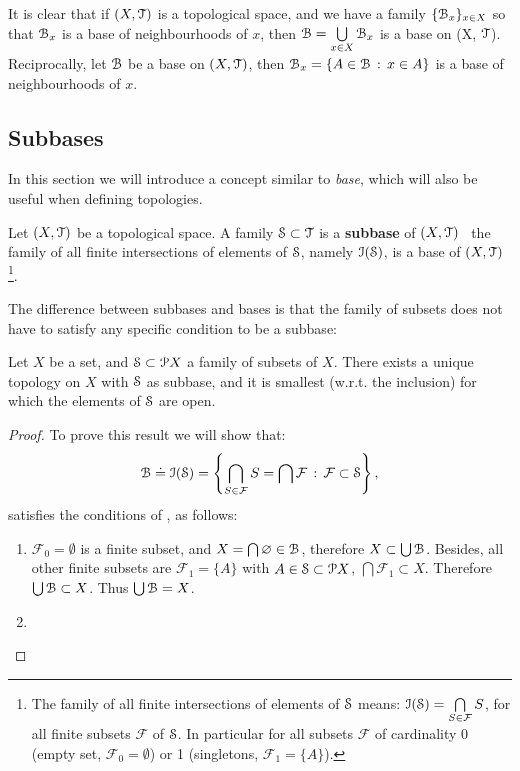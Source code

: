It is clear that if $(X,\T)$ is a topological space, and we have a family 
$\{\B_x\}_{x\in X}$ so that $\B_x$ is a base of neighbourhoods of $x$, then 
$\B=\bigcup\limits_{x\in X}\B_x$ is a base on (X, $\T$).
Reciprocally, let $\B$ be a base on $(X, \T)$, then $\B_x = \setdef{A\in\B}{x\in A}$ is
a base of neighbourhoods of $x$.

\subsection{Subbases}\label{subsec:subbases}

In this section we will introduce a concept similar to \emph{base}, which will also be 
useful when defining topologies.

\begin{definition}
	\label{def:subbase}
	Let $(X, \T)$ be a topological space. A family $\S\subset \T$ is a \textbf{subbase} 
	of $(X, \T)$ \iff\ the family of all finite intersections of elements of $\S$, namely $\I(\S)$, is a base of $(X, \T)$\footnote{The family of all finite intersections of elements of $\S$ means: $\I(\S) = \bigcap\limits_{S\in\mathcal{F}} S$, for all finite subsets $\mathcal{F}$ of $\S$. In particular for all subsets $\mathcal{F}$ of cardinality 0 (empty set, $\mathcal{F}_0=\emptyset$) or 1 (singletons, $\mathcal{F}_1=\{A\}$).}.
\end{definition}

The difference between subbases and bases is that the family of subsets does not have 
to satisfy any specific condition to be a subbase:

\begin{theorem}
	Let $X$ be a set, and $\S\subset \P X$ a family of subsets of $X$.
	There exists a unique topology on $X$ with $\S$ as subbase, and it is smallest
	(w.r.t. the inclusion) for which the elements of $\S$ are open.
	\label{th:1-4}
\end{theorem}

\begin{proof}
	To prove this result we will show that: 
	$$
	 \B\doteq \I(\S)=\left\{\bigcap\limits_{S\in\mathcal{F}} S=\bigcap\mathcal{F}\,:\,\mathcal{F}\subset \S\right\},
	$$ 
	satisfies the conditions of , as follows:
	\begin{enumerate}
	\item $\mathcal{F}_{0}=\emptyset$ is a finite subset, and $X=\bigcap \emptyset\in\B$, therefore $X\subset \bigcup\B$. Besides, all other finite subsets are $\mathcal{F}_{1}=\{A\}$ with $A\in\S\subset\P X$, $\bigcap\mathcal{F}_{1}\subset X$. Therefore $\bigcup \B\subset X$. Thus $\bigcup\B = X$.
	\item 
	\end{enumerate}
\end{proof}
